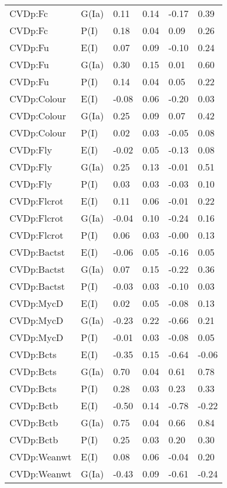 \begin{center}
\begin{longtable}{|p{1.1in}|p{0.7in}|p{0.7in}|p{0.6in}|p{0.6in}|p{0.6in}|}
  CVDp:Fc & G(Ia) & 0.11 & 0.14 & -0.17 & 0.39 \\ 
  CVDp:Fc & P(I) & 0.18 & 0.04 & 0.09 & 0.26 \\ 
  CVDp:Fu & E(I) & 0.07 & 0.09 & -0.10 & 0.24 \\ 
  CVDp:Fu & G(Ia) & 0.30 & 0.15 & 0.01 & 0.60 \\ 
  CVDp:Fu & P(I) & 0.14 & 0.04 & 0.05 & 0.22 \\ 
  CVDp:Colour & E(I) & -0.08 & 0.06 & -0.20 & 0.03 \\ 
  CVDp:Colour & G(Ia) & 0.25 & 0.09 & 0.07 & 0.42 \\ 
  CVDp:Colour & P(I) & 0.02 & 0.03 & -0.05 & 0.08 \\ 
  CVDp:Fly & E(I) & -0.02 & 0.05 & -0.13 & 0.08 \\ 
  CVDp:Fly & G(Ia) & 0.25 & 0.13 & -0.01 & 0.51 \\ 
  CVDp:Fly & P(I) & 0.03 & 0.03 & -0.03 & 0.10 \\ 
  CVDp:Flcrot & E(I) & 0.11 & 0.06 & -0.01 & 0.22 \\ 
  CVDp:Flcrot & G(Ia) & -0.04 & 0.10 & -0.24 & 0.16 \\ 
  CVDp:Flcrot & P(I) & 0.06 & 0.03 & -0.00 & 0.13 \\ 
  CVDp:Bactst & E(I) & -0.06 & 0.05 & -0.16 & 0.05 \\ 
  CVDp:Bactst & G(Ia) & 0.07 & 0.15 & -0.22 & 0.36 \\ 
  CVDp:Bactst & P(I) & -0.03 & 0.03 & -0.10 & 0.03 \\ 
  CVDp:MycD & E(I) & 0.02 & 0.05 & -0.08 & 0.13 \\ 
  CVDp:MycD & G(Ia) & -0.23 & 0.22 & -0.66 & 0.21 \\ 
  CVDp:MycD & P(I) & -0.01 & 0.03 & -0.08 & 0.05 \\ 
  CVDp:Bcts & E(I) & -0.35 & 0.15 & -0.64 & -0.06 \\ 
  CVDp:Bcts & G(Ia) & 0.70 & 0.04 & 0.61 & 0.78 \\ 
  CVDp:Bcts & P(I) & 0.28 & 0.03 & 0.23 & 0.33 \\ 
  CVDp:Bctb & E(I) & -0.50 & 0.14 & -0.78 & -0.22 \\ 
  CVDp:Bctb & G(Ia) & 0.75 & 0.04 & 0.66 & 0.84 \\ 
  CVDp:Bctb & P(I) & 0.25 & 0.03 & 0.20 & 0.30 \\ 
  CVDp:Weanwt & E(I) & 0.08 & 0.06 & -0.04 & 0.20 \\ 
  CVDp:Weanwt & G(Ia) & -0.43 & 0.09 & -0.61 & -0.24 \\ 

\end{longtable}
\end{center}
